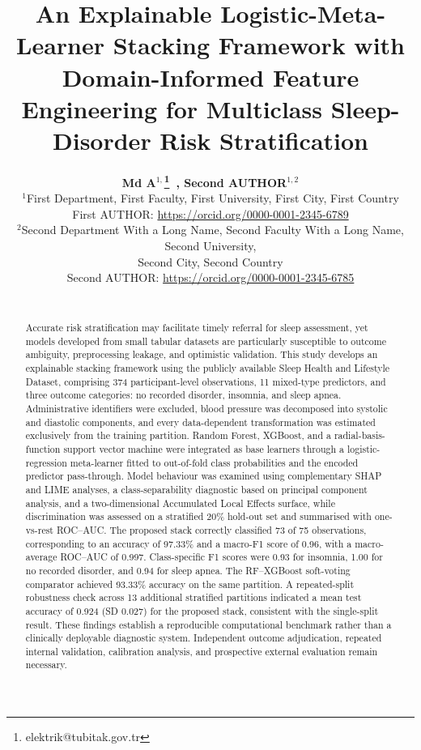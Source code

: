 \documentclass{elektr}
\title{
An Explainable Logistic-Meta-Learner Stacking Framework with Domain-Informed Feature Engineering for Multiclass Sleep-Disorder Risk Stratification \\

}
\author[AUTHOR and AUTHOR]{
	\textbf{Md A$^{1,}$\thanks{elektrik@tubitak.gov.tr}~, Second AUTHOR$^{1,2}$}\\
 
	$^{1}$First Department, First Faculty, First University, First City, First Country\\ 	First AUTHOR: \url{https://orcid.org/0000-0001-2345-6789} \\
	$^{2}$Second Department With a Long Name, Second Faculty With a Long Name, Second University,\\ Second City, Second Country\\ Second AUTHOR: \url{https://orcid.org/0000-0001-2345-6785}\\
\\

\rec{...}
\acc{...}
\finv{...}
}
\begin{document}
\raggedbottom

\maketitle

\begin{abstract}Accurate risk stratification may facilitate timely referral for sleep assessment, yet models developed from small tabular datasets are particularly susceptible to outcome ambiguity, preprocessing leakage, and optimistic validation. This study develops an explainable stacking framework using the publicly available Sleep Health and Lifestyle Dataset, comprising 374 participant-level observations, 11 mixed-type predictors, and three outcome categories: no recorded disorder, insomnia, and sleep apnea. Administrative identifiers were excluded, blood pressure was decomposed into systolic and diastolic components, and every data-dependent transformation was estimated exclusively from the training partition. Random Forest, XGBoost, and a radial-basis-function support vector machine were integrated as base learners through a logistic-regression meta-learner fitted to out-of-fold class probabilities and the encoded predictor pass-through. Model behaviour was examined using complementary SHAP and LIME analyses, a class-separability diagnostic based on principal component analysis, and a two-dimensional Accumulated Local Effects surface, while discrimination was assessed on a stratified 20\% hold-out set and summarised with one-vs-rest ROC--AUC. The proposed stack correctly classified 73 of 75 observations, corresponding to an accuracy of 97.33\% and a macro-F1 score of 0.96, with a macro-average ROC--AUC of 0.997. Class-specific F1 scores were 0.93 for insomnia, 1.00 for no recorded disorder, and 0.94 for sleep apnea. The RF--XGBoost soft-voting comparator achieved 93.33\% accuracy on the same partition. A repeated-split robustness check across 13 additional stratified partitions indicated a mean test accuracy of 0.924 (SD 0.027) for the proposed stack, consistent with the single-split result. These findings establish a reproducible computational benchmark rather than a clinically deployable diagnostic system. Independent outcome adjudication, repeated internal validation, calibration analysis, and prospective external evaluation remain necessary.

\end{abstract}
\end{document}

